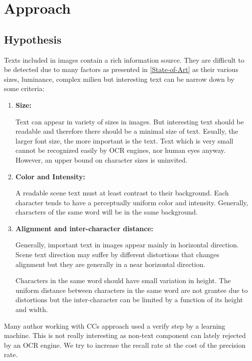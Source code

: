   
\graphicspath{ {4chapterOurApproach/image/} }
\chapter{Approach} \label{Approach}
\section{Hypothesis}
\par
Texts included in images contain a rich information source. They are difficult to be detected due to many factors as presented in \ref{State-of-Art} as their various sizes, luminance, complex milieu but interesting text can be narrow down by some criteria:
\begin{enumerate}
\item {\textbf{Size:}}
\par
Text can appear in variety of sizes in images. But interesting text should be readable and therefore there should be a minimal size of text. Esually, the larger font size, the more important is the text. Text which is very small cannot be recognized easily by OCR engines, nor human eyes anyway. However, an upper bound on character sizes is uninvited.
\item {\textbf{Color and Intensity:}}
\par
A readable scene text must at least contrast to their background. Each character tends to have a perceptually uniform color and intensity. Generally, characters of the same word will be in the same background.
\item {\textbf{Alignment and inter-character distance:}}
\par
Generally, important text in images appear mainly in horizontal direction. Scene text direction may suffer by different distortions that changes alignment but they are generally in a near horizontal direction. 
\par
Characters in the same word should have small variation in height. The uniform distance between characters in the same word are not grantee due to distortions but the inter-character can be limited by a function of its height and width. 
\end{enumerate}
\par
Many author working with CCs approach used a verify step by a learning machine. This is not really interesting as non-text component can lately rejected by an OCR engine. We try to increase the recall rate at the cost of the precision rate.

